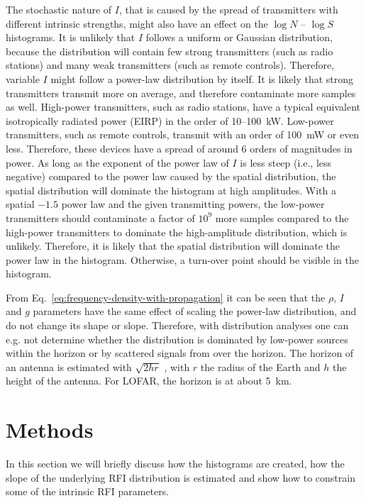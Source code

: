 \documentclass[useAMS,usenatbib]{mn2e}
\begin{document}
The stochastic nature of $I$, that is caused by the spread of transmitters with different intrinsic strengths, might also have an effect on the $\log N$ -- $\log S$ histograms. It is unlikely that $I$ follows a uniform or Gaussian distribution, because the distribution will contain few strong transmitters (such as radio stations) and many weak transmitters (such as remote controls). Therefore, variable $I$ might follow a power-law distribution by itself. It is likely that strong transmitters transmit more on average, and therefore contaminate more samples as well. High-power transmitters, such as radio stations, have a typical equivalent isotropically radiated power (EIRP) in the order of 10--100~kW. Low-power transmitters, such as remote controls, transmit with an order of 100~mW or even less. Therefore, these devices have a spread of around 6 orders of magnitudes in power. As long as the exponent of the power law of $I$ is less steep (i.e., less negative) compared to the power law caused by the spatial distribution, the spatial distribution will dominate the histogram at high amplitudes. With a spatial $-1.5$ power law and the given transmitting powers, the low-power transmitters should contaminate a factor of $10^9$ more samples compared to the high-power transmitters to dominate the high-amplitude distribution, which is unlikely. Therefore, it is likely that the spatial distribution will dominate the power law in the histogram. Otherwise, a turn-over point should be visible in the histogram.

From Eq.~\eqref{eq:frequency-density-with-propagation} it can be seen that the $\rho$, $I$ and $g$ parameters have the same effect of scaling the power-law distribution, and do not change its shape or slope. Therefore, with distribution analyses one can e.g. not determine whether the distribution is dominated by low-power sources within the horizon or by scattered signals from over the horizon. The horizon of an antenna is estimated with $\sqrt{2hr}$ \citep{bullington-propagation}, with $r$ the radius of the Earth and $h$ the height of the antenna. For LOFAR, the horizon is at about 5~km.

\section{Methods} \label{sec:distribution-methods}
In this section we will briefly discuss how the histograms are created, how the slope of the underlying RFI distribution is estimated and show how to constrain some of the intrinsic RFI parameters.
\end{document}
